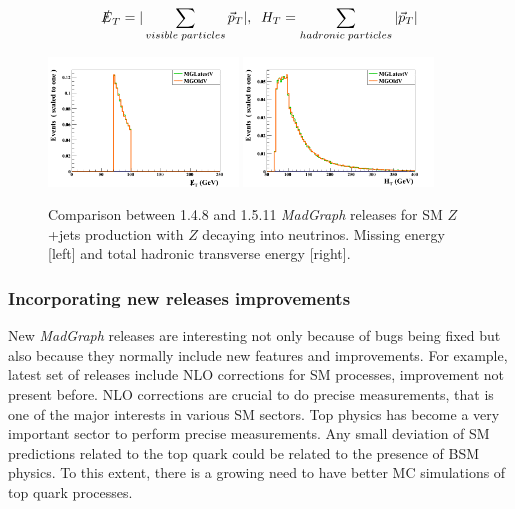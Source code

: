 \begin{equation}
  \label{eq:METHT}
  \slashed{E}_{T}=|\sum_{visible\; particles}\vec{p}_{T}|, \; \; H_{T}=\sum_{hadronic\; particles}|\vec{p}_{T}|
\end{equation}

\begin{figure}[!Hhtbp]
  \begin{center}
    \includegraphics[width=0.45\textwidth]{figs/ZjetsRelVal8.png}
    \includegraphics[width=0.45\textwidth]{figs/ZjetsRelVal9.png}
    \caption{Comparison between 1.4.8 and 1.5.11 \textit{MadGraph} releases for SM $Z$+jets production with $Z$ decaying into neutrinos. Missing energy [left] and total hadronic transverse energy [right].}
    \label{fig:ZRelVal2}
  \end{center}
\end{figure}

\subsubsection{Incorporating new releases improvements}

New \textit{MadGraph} releases are interesting not only because of bugs being fixed but also because they normally include new features and improvements. For example, latest set of releases include NLO corrections for SM processes, improvement not present before. NLO corrections are crucial to do precise measurements, that is one of the major interests in various SM sectors. Top physics has become a very important sector to perform precise measurements. Any small deviation of SM predictions related to the top quark could be related to the presence of BSM physics. To this extent, there is a growing need to have better MC simulations of top quark processes.

